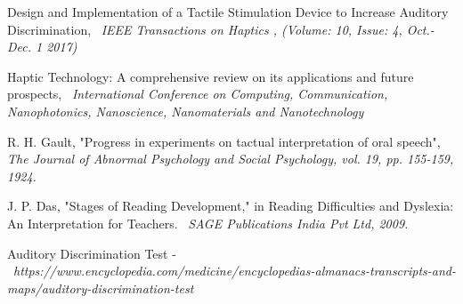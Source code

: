 \begin{thebibliography}{2}

    Design and Implementation of a Tactile Stimulation Device to Increase Auditory Discrimination, 
    \ \textit{IEEE Transactions on Haptics , (Volume: 10, Issue: 4, Oct.- Dec. 1 2017) }
    
    \bibitem{}Haptic Technology:  A comprehensive review on its applications and future prospects,
    \ \textit{International Conference on Computing, Communication, Nanophotonics, Nanoscience, Nanomaterials and Nanotechnology }

    \bibitem{}R. H. Gault, "Progress in experiments on tactual interpretation of oral speech",
    \ \textit{ The Journal of Abnormal Psychology and Social Psychology, vol. 19, pp. 155-159, 1924.}

    \bibitem{}J. P. Das, "Stages of Reading Development," in Reading  Difficulties and Dyslexia: An Interpretation for Teachers. 
    \ \textit{SAGE Publications India Pvt Ltd, 2009.}  
 
    \bibitem{}Auditory Discrimination Test - 
    \ \textit{https://www.encyclopedia.com/medicine/encyclopedias-almanacs-transcripts-and-maps/auditory-discrimination-test}

\end{thebibliography}
